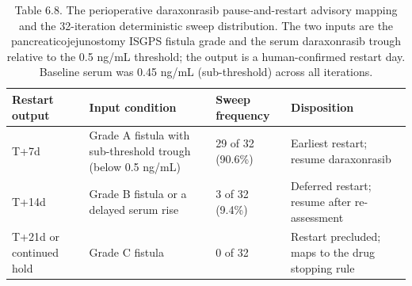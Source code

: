 \begin{table}[t]
\caption{Table 6.8. The perioperative daraxonrasib pause-and-restart advisory mapping
and the 32-iteration deterministic sweep distribution. The two inputs are the
pancreaticojejunostomy ISGPS fistula grade and the serum daraxonrasib trough relative
to the 0.5 ng/mL threshold; the output is a human-confirmed restart day. Baseline
serum was 0.45 ng/mL (sub-threshold) across all iterations.}
\label{tab:sec06-advisory}
\centering
\begin{tabularx}{\textwidth}{L{3.0cm} L{4.2cm} L{2.8cm} Y}
\toprule
\textbf{Restart output} & \textbf{Input condition} & \textbf{Sweep frequency} & \textbf{Disposition} \\
\midrule
T+7d & Grade A fistula with sub-threshold trough (below 0.5 ng/mL) & 29 of 32 (90.6\%) & Earliest restart; resume daraxonrasib \\
T+14d & Grade B fistula or a delayed serum rise & 3 of 32 (9.4\%) & Deferred restart; resume after re-assessment \\
T+21d or continued hold & Grade C fistula & 0 of 32 & Restart precluded; maps to the drug stopping rule \\
\bottomrule
\end{tabularx}
\end{table}

